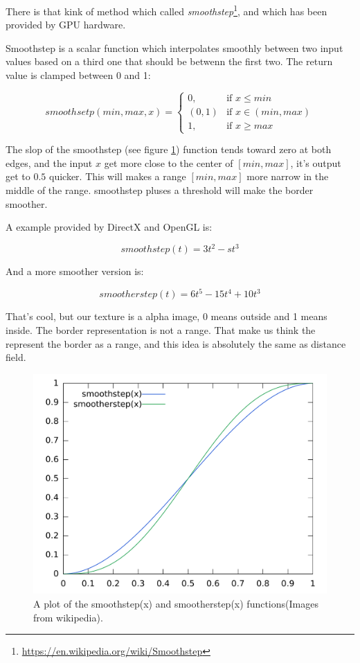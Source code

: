There is that kink of method which called \textit{smoothstep}\footnote{\url{https://en.wikipedia.org/wiki/Smoothstep}}, and which has been provided by GPU hardware.

Smoothstep is a scalar function which interpolates smoothly between two input values based on a third one that should be betwenn the first two. The return value is clamped between 0 and 1:

\begin{equation}
	smoothsetp(min,max,x)=
	\begin{cases}
		0,& \text{if } x\leq min\\
		(0,1) &\text{if } x\in(min,max)\\
		1,& \text{if } x\geq max
	\end{cases}
\end{equation} 

The slop of the smoothstep (see figure \ref{f:smoothstep}) function tends toward zero at both edges, and the input $x$ get more close to the center of $[min,max]$, it's output get to $0.5$ quicker. This will makes a range $[min,max]$ more narrow in the middle of the range. smoothstep pluses a threshold will make the border smoother.

A example provided by DirectX and OpenGL is:

\begin{equation}
	smoothstep(t)=3t^{2}-st^{3}
\end{equation}

And a more smoother version is:

\begin{equation}
	smootherstep(t)=6t^{5}-15t^{4}+10t^{3}
\end{equation}

That's cool, but our texture is a alpha image, 0 means outside and 1 means inside. The border representation is not a range. That make us think the represent the border as a range, and this idea is absolutely the same as distance field.

\begin{figure}\label{f:smoothstep}
	\includegraphics[width=1.0\textwidth]{graphics/df/Smoothstep_and_Smootherstep}
	\caption{A plot of the smoothstep(x) and smootherstep(x) functions(Images from wikipedia).}
\end{figure}

